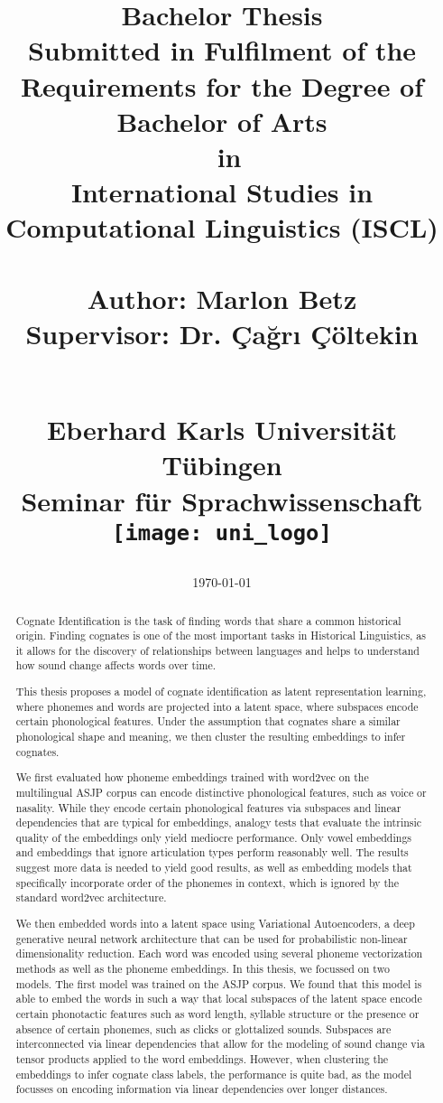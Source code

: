 \documentclass[6pt]{article}
\title{
	{Bachelor Thesis}\\
	{\normalsize Submitted in Fulfilment of the Requirements for the Degree of} \\ %
{\large Bachelor of Arts} \\ %
	 {\small in} \\  %
	 {\large  International Studies in Computational Linguistics (ISCL) } \\ \vspace*{1cm} \hline \vspace*{1cm} 
	{\Huge \mathrm{Unsupervised Cognate Identification with Variational Autoencoders}}\\ \vspace*{1cm} \hline \vspace*{1cm}
	{\LARGE  Author: Marlon Betz }  \\
	{\LARGE  Supervisor: Dr. Çağrı Çöltekin }  \\
\date{\today} \\
\vspace*{2cm}
	{\Large Eberhard Karls Universität Tübingen}\\
	{\large Seminar für Sprachwissenschaft} \\
	\vspace*{1cm}
	{\texttt{[image: uni\_logo]}}
}
\begin{document}
\thispagestyle{empty}
\maketitle
\thispagestyle{empty}
\newpage

 

\newpage

\thispagestyle{empty}
\newpage

\begin{abstract}
\thispagestyle{empty}

Cognate Identification is the task of finding words that share a common historical origin. Finding cognates is one of the most important tasks in Historical Linguistics, as it allows for the discovery of relationships between languages and helps to understand how sound change affects words over time.

This thesis proposes a model of cognate identification as latent representation learning, where phonemes and words are projected into a latent space, where subspaces encode certain phonological features. Under the assumption that cognates share a similar phonological shape and meaning, we then cluster the resulting embeddings to infer cognates.

We first evaluated how phoneme embeddings trained with word2vec on the multilingual ASJP corpus can encode distinctive phonological features, such as voice or nasality. While they encode certain phonological features via subspaces and linear dependencies that are typical for embeddings, analogy tests that evaluate the intrinsic quality of the embeddings only yield mediocre performance. Only vowel embeddings and embeddings that ignore articulation types perform reasonably well. The results suggest more data is needed to yield good results, as well as embedding models that specifically incorporate order of the phonemes in context, which is ignored by the standard word2vec architecture.

We then embedded words into a latent space using Variational Autoencoders, a deep generative neural network architecture that can be used for probabilistic non-linear dimensionality reduction. Each word was encoded using several phoneme vectorization methods as well as the phoneme embeddings. In this thesis, we focussed on two models. The first model was trained on the ASJP corpus. We found that this model is able to embed the words in such a way that local subspaces of the latent space encode certain phonotactic features such as word length, syllable structure or the presence or absence of certain phonemes, such as clicks or glottalized sounds. Subspaces are interconnected via linear dependencies that allow for the modeling of sound change via tensor products applied to the word embeddings.  However, when clustering the embeddings to infer cognate class labels, the performance is quite bad, as the model focusses on encoding information via linear dependencies over longer distances. 


\end{abstract}
\end{document}
